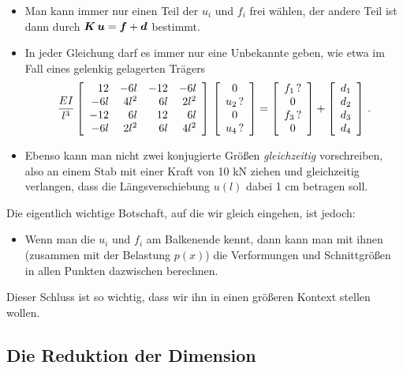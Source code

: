 {{{{\begin{itemize}
  \item Man kann immer nur einen Teil der $u_i$ und $f_i$ frei w\"{a}hlen, der andere Teil ist dann durch  $\vek K\,\vek u = \vek f + \vek d$ bestimmt.
  \item In jeder Gleichung darf es immer nur eine Unbekannte geben, wie etwa im Fall eines gelenkig gelagerten Tr\"{a}gers
  \begin{align}
 \frac{EI}{l^3} \left[
\begin{array}{r r r r}
 12 & -6l & -12 &-6l \\
 -6l & 4l^2 & 6l &2l^2 \\
 -12 & 6l & 12 & 6l \\
 -6l &2l^2 &6l &4l^2
 \end{array}
  \right]\,\left [\barr{c}  0 \\ u_2 \,?\\ 0 \\ u_4 \,?\earr \right ] = \left [\barr{c}  f_1 \,?\\ 0 \\ f_3\,? \\ 0 \earr \right ] + \left [\barr{c}  d_1 \\ d_2 \\ d_3 \\d_4 \earr \right ]\,.
\end{align}
  \item Ebenso kann man nicht zwei konjugierte Gr\"{o}{\ss}en {\em gleichzeitig \/} vorschreiben, also an einem Stab mit einer Kraft von 10 kN ziehen und gleichzeitig ver\-langen, dass die L\"{a}ngsverschiebung $u(l)$ dabei 1 cm betragen soll.
\end{itemize}

Die eigentlich wichtige Botschaft, auf die wir gleich eingehen, ist jedoch:

\begin{itemize}
  \item Wenn man die $u_i$ und $f_i$ am Balkenende kennt, dann kann man mit ihnen (zusammen mit der Belastung $p(x)$) die Verformungen und Schnittgr\"{o}{\ss}en in allen Punkten dazwischen berechnen.
\end{itemize}

Dieser Schluss ist so wichtig, dass wir ihn in einen gr\"{o}{\ss}eren Kontext stellen wollen.


{\textcolor{sectionTitleBlue}{\section{Die Reduktion der Dimension}}}

}}}}
